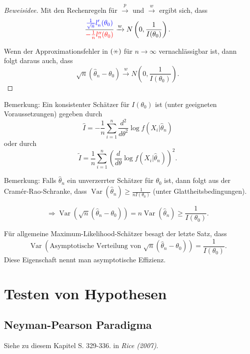 \documentclass{tstextbook}
\DeclareMathOperator{\Var}{Var}
\begin{document}
\begin{proof}[Beweisidee]
		Mit den Rechenregeln für $ \xrightarrow{p} $ und $ \xrightarrow{w} $ ergibt sich, dass
		\[
		\frac{\textcolor{blue}{\frac{1}{\sqrt{n}}l_n^\prime(\theta_0)}}{\textcolor{red}{-\frac{1}{n}l_n^{\prime\prime}(\theta_0)}} \xrightarrow{w} N\left(0,\frac{1}{I(\theta_0)}\right).
		\]
		
		Wenn der Approximationsfehler in $ (\hexstar) $ für $ n\to\infty $ vernachlässigbar ist, dann folgt daraus auch, dass 
		\[
		\sqrt{n}(\hat{\theta}_n-\theta_0) \xrightarrow{w} N\left(0,\frac{1}{I(\theta_0)}\right).
		\]
	\end{proof}
	
	\begin{remark}
		Bemerkung: Ein konsistenter Schätzer für $ I(\theta_0) $ ist (unter geeigneten Voraussetzungen) gegeben durch 
		\[
		\hat{I} = -\frac{1}{n}\sum_{i=1}^{n}\frac{d^2}{d\theta^2}\log f(X_i|\hat{\theta}_n)
		\] oder durch
		\[
		\tilde{I} = \frac{1}{n}\sum_{i=1}^{n}\left(\frac{d}{d\theta}\log f(X_i|\hat{\theta}_n)\right)^2.
		\]
	\end{remark}

	\begin{remark}
		Bemerkung: Falls $ \hat{\theta}_n $ ein unverzerrter Schätzer für $ \theta_0 $ ist, dann folgt aus der Cramér-Rao-Schranke, dass $ \Var(\hat{\theta}_n) \ge \frac{1}{nI(\theta_0)}$ (unter Glattheitsbedingungen).
		
		\[ \Rightarrow \Var(\sqrt{n}(\hat{\theta}_n-\theta_0)) = n\Var(\hat{\theta}_n) \ge \frac{1}{I(\theta_0)} .
		\] 
		
		Für allgemeine Maximum-Likelihood-Schätzer besagt der letzte Satz, dass 
		\[
		\Var(\text{Asymptotische Verteilung von }\sqrt{n}(\hat{\theta}_n-\theta_0))=\frac{1}{I(\theta_0)}.
		\]
		Diese Eigenschaft nennt man asymptotische Effizienz.
	\end{remark}


\chapter{Testen von Hypothesen}

\section{Neyman-Pearson Paradigma}
	\begin{book}
	Siehe zu diesem Kapitel S. 329-336. in	\textit{Rice (2007)}.
\end{book}
\end{document}
